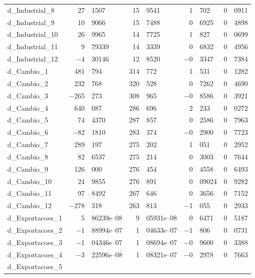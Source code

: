 \documentclass[11pt]{article}
\begin{document}
\begin{center}
\begin{tabular}{lr@{,}lr@{,}lr@{,}lr@{,}l}
d\_Industrial\_8 &
  27&1507 &
    15&9541 &
      1&702 &
        0&0911 \\
d\_Industrial\_9 &
  10&9066 &
    15&7488 &
      0&6925 &
        0&4898 \\
d\_Industrial\_10 &
  26&9965 &
    14&7725 &
      1&827 &
        0&0699 \\
d\_Industrial\_11 &
  9&79339 &
    14&3339 &
      0&6832 &
        0&4956 \\
d\_Industrial\_12 &
  $-$4&30146 &
    12&8520 &
      $-$0&3347 &
        0&7384 \\
d\_Cambio\_1 &
  481&794 &
    314&772 &
      1&531 &
        0&1282 \\
d\_Cambio\_2 &
  232&768 &
    320&528 &
      0&7262 &
        0&4690 \\
d\_Cambio\_3 &
  $-$265&273 &
    308&965 &
      $-$0&8586 &
        0&3921 \\
d\_Cambio\_4 &
  640&087 &
    286&696 &
      2&233 &
        0&0272 \\
d\_Cambio\_5 &
  74&4370 &
    287&857 &
      0&2586 &
        0&7963 \\
d\_Cambio\_6 &
  $-$82&1810 &
    283&374 &
      $-$0&2900 &
        0&7723 \\
d\_Cambio\_7 &
  289&197 &
    275&202 &
      1&051 &
        0&2952 \\
d\_Cambio\_8 &
  82&6537 &
    275&214 &
      0&3003 &
        0&7644 \\
d\_Cambio\_9 &
  126&000 &
    276&454 &
      0&4558 &
        0&6493 \\
d\_Cambio\_10 &
  24&9855 &
    276&891 &
      0&09024 &
        0&9282 \\
d\_Cambio\_11 &
  97&8492 &
    267&646 &
      0&3656 &
        0&7152 \\
d\_Cambio\_12 &
  $-$278&318 &
    263&813 &
      $-$1&055 &
        0&2933 \\
d\_Exportacoes\_1 &
  5&86239\textrm{e--08} &
    9&05931\textrm{e--08} &
      0&6471 &
        0&5187 \\
d\_Exportacoes\_2 &
  $-$1&88994\textrm{e--07} &
    1&04633\textrm{e--07} &
      $-$1&806 &
        0&0731 \\
d\_Exportacoes\_3 &
  $-$1&04346\textrm{e--07} &
    1&08694\textrm{e--07} &
      $-$0&9600 &
        0&3388 \\
d\_Exportacoes\_4 &
  $-$3&22596\textrm{e--08} &
    1&08321\textrm{e--07} &
      $-$0&2978 &
        0&7663 \\
d\_Exportacoes\_5 &

\end{tabular}
\end{center}
\end{document}
